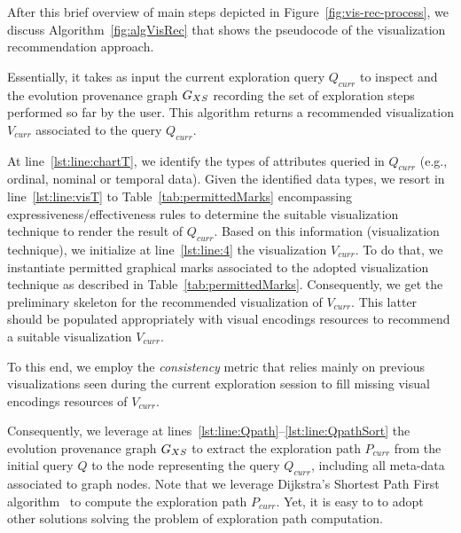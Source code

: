 After this brief overview of main steps depicted in Figure~\ref{fig:vis-rec-process}, we discuss Algorithm~\ref{fig:algVisRec} that shows the pseudocode of the visualization recommendation approach.  




Essentially, it takes as input the current exploration query $Q_{curr}$ to inspect and the evolution provenance graph $G_{XS}$ recording the set of exploration steps performed so far by the user. 
This algorithm returns a recommended visualization $V_{curr}$ associated to the query $Q_{curr}$.



At line~\ref{lst:line:chartT}, we identify the types of attributes queried in $Q_{curr}$ (e.g., ordinal, nominal or temporal data). 
Given the identified data types, we resort in line~\ref{lst:line:visT} to Table~\ref{tab:permittedMarks} encompassing expressiveness/effectiveness rules to determine the suitable visualization technique to render the result of $Q_{curr}$.
Based on this information (visualization technique), we initialize at line~\ref{lst:line:4} the visualization $V_{curr}$. To do that, we instantiate permitted graphical marks associated to the adopted visualization technique as described in Table~\ref{tab:permittedMarks}. Consequently, we get the preliminary skeleton for the recommended visualization of $V_{curr}$. This latter should be populated appropriately with visual encodings resources to recommend a suitable visualization $V_{curr}$.



To this end, we employ the \emph{consistency} metric that relies mainly on previous visualizations seen during the current exploration session to fill missing visual encodings resources of $V_{curr}$.

Consequently, we leverage at lines~\ref{lst:line:Qpath}--\ref{lst:line:QpathSort} the evolution provenance graph $G_{XS}$ to extract the exploration path $P_{curr}$ from the initial query $Q$ to the node representing the query $Q_{curr}$, including all meta-data associated to graph nodes.
Note that we leverage Dijkstra's Shortest Path First algorithm~\cite{Dijkstra:1959:NTP} to compute the exploration path $P_{curr}$. Yet, it is easy to to adopt other solutions solving the problem of exploration path computation.


